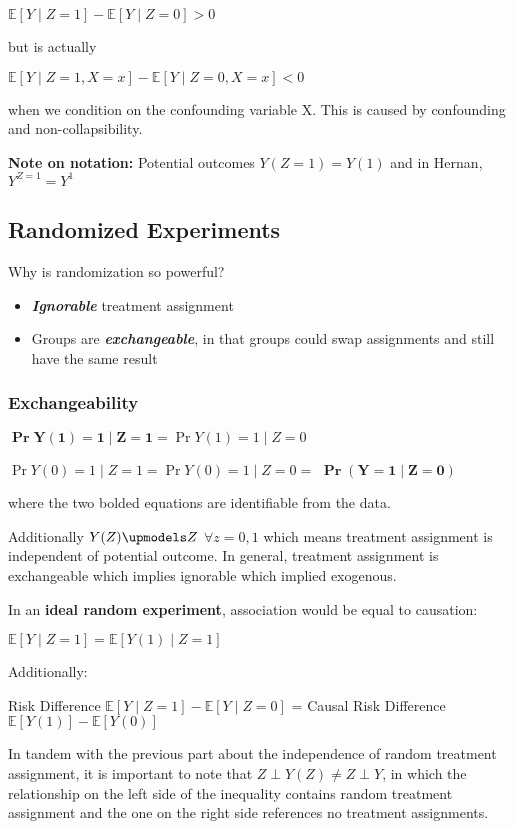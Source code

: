 \documentclass[11pt]{elegantbook}
\begin{document}
\begin{center}
    $\mathbb{E}[Y \mid Z=1] - \mathbb{E}[Y \mid Z=0] > 0$ 
\end{center}
but is actually 
\begin{center}
    $\mathbb{E}[Y \mid Z=1, X=x] - \mathbb{E}[Y \mid Z=0, X=x] <0$ 
\end{center} 
when we condition on the confounding variable X. This is caused by confounding and non-collapsibility.

    \textbf{Note on notation:} Potential outcomes $Y(Z=1) = Y(1)$ and in Hernan, $Y^{Z=1} = Y^1$

\subsection{Randomized Experiments}
    Why is randomization so powerful? 
    \begin{itemize}
        \item\textit{\textbf{Ignorable}} treatment assignment
        \item Groups are \textit{\textbf{exchangeable}}, in that groups could swap assignments and still have the same result
    \end{itemize}

\subsubsection{Exchangeability}
$\boldsymbol{\Pr{Y(1) = 1 \mid Z = 1}}= \Pr{Y(1) = 1 \mid Z = 0}$

$\Pr{Y(0) = 1 \mid Z = 1} = \Pr{Y(0) = 1 \mid Z = 0} =$
$ 
\boldsymbol{\Pr(Y = 1 \mid Z = 0)}$

where the two bolded equations are identifiable from the data. 

    Additionally $Y(Z) \upmodels Z$  $\forall  z = 0, 1$ which means treatment assignment is independent of potential outcome. In general, treatment assignment is exchangeable which implies ignorable which implied exogenous.

    In an \textbf{ideal random experiment}, association would be equal to causation:
\begin{center}$\mathbb{E}[Y \mid Z=1] = \mathbb{E}[Y(1)\mid Z=1]$ \end{center}
    Additionally:
\begin{center} Risk Difference $\mathbb{E}[Y \mid Z=1] - \mathbb{E}[Y\mid Z=0]$ = Causal Risk Difference $\mathbb{E}[Y(1)] - \mathbb{E}[Y(0)]$\end{center}
In tandem with the previous part about the independence of random treatment assignment, it is important to note that $Z \perp 
 Y(Z) \neq Z\perp Y$,  in which the relationship on the left side of the inequality contains random treatment assignment and the one on the right side references no treatment assignments.
\end{document}
